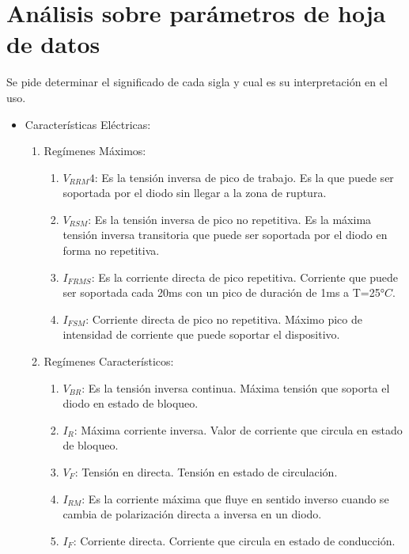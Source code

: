 \documentclass[chaptersright]{informeutn}
\begin{document}
    \chapter{Análisis sobre parámetros de hoja de datos}
        Se pide  determinar el significado de cada sigla y cual es su interpretación en el uso.
        \begin{itemize}
            \item Características Eléctricas:
                \begin{enumerate}
                    \item Regímenes Máximos:
                        \begin{enumerate}
                            \item $V_{RRM}4$: Es la tensión inversa de pico de trabajo. Es la que puede ser soportada por el diodo sin llegar a la zona de ruptura.
                            \item $V_{RSM}$: Es la tensión inversa de pico no repetitiva. Es la máxima tensión inversa transitoria que puede ser soportada  por el diodo en forma no repetitiva.
                            \item $I_{FRMS}$: Es la corriente directa de pico repetitiva. Corriente que puede ser soportada cada 20ms con un pico de duración de 1ms a T=25$°C$.
                            \item $I_{FSM}$: Corriente directa de pico no repetitiva. Máximo pico de intensidad de corriente que puede soportar el dispositivo.
                        \end{enumerate}
                    \item Regímenes Característicos:
                        \begin{enumerate}
                            \item $V_{BR}$: Es la tensión inversa continua. Máxima tensión que soporta el diodo en estado de bloqueo.
                            \item $I_R$: Máxima corriente inversa. Valor de corriente que circula en estado de bloqueo.
                            \item $V_F$: Tensión en directa. Tensión en estado de circulación.
                            \item $I_{RM}$: Es la corriente máxima que fluye en sentido inverso cuando se cambia de polarización directa a inversa en un diodo. 
                            \item $I_F$: Corriente directa. Corriente que circula en estado de conducción.

\end{enumerate}
\end{enumerate}
\end{itemize}
\end{document}
